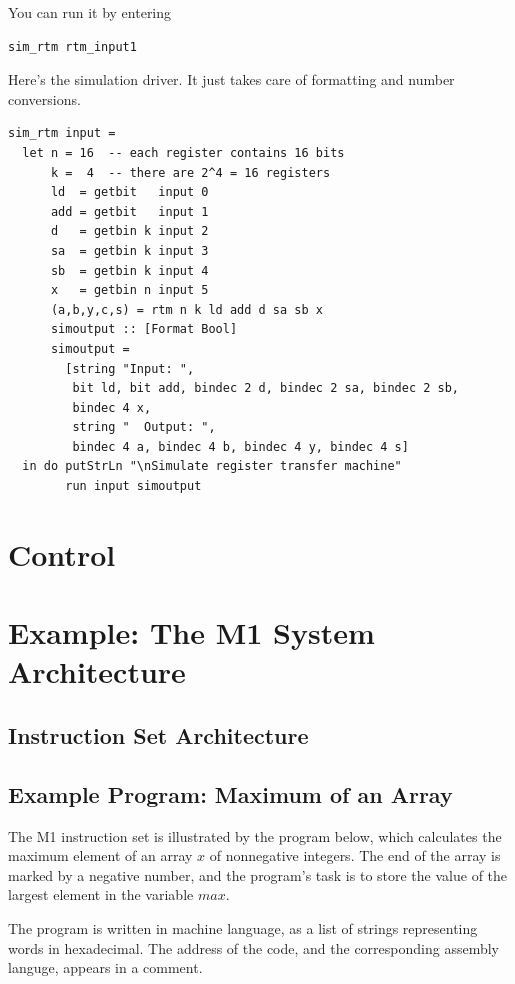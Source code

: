 \documentclass[a4paper,openany,fleqn]{book}
\begin{document}
You can run it by entering

\begin{verbatim}
sim_rtm rtm_input1
\end{verbatim}

Here's the simulation driver.  It just takes care of formatting and
number conversions.

\begin{verbatim}
sim_rtm input =
  let n = 16  -- each register contains 16 bits
      k =  4  -- there are 2^4 = 16 registers
      ld  = getbit   input 0
      add = getbit   input 1
      d   = getbin k input 2
      sa  = getbin k input 3
      sb  = getbin k input 4
      x   = getbin n input 5
      (a,b,y,c,s) = rtm n k ld add d sa sb x
      simoutput :: [Format Bool]
      simoutput =
        [string "Input: ",
         bit ld, bit add, bindec 2 d, bindec 2 sa, bindec 2 sb,
         bindec 4 x,
         string "  Output: ",
         bindec 4 a, bindec 4 b, bindec 4 y, bindec 4 s]
  in do putStrLn "\nSimulate register transfer machine"
        run input simoutput
\end{verbatim}


\chapter{Control}
\label{sec:control}

\chapter{Example: The M1 System Architecture}
\label{sec:M1-system-architecture}

\section{Instruction Set Architecture}
\label{sec:instr-set-arch}

\section{Example Program: Maximum of an Array}
\label{sec:m1-max-program}

The M1 instruction set is illustrated by the program below, which
calculates the maximum element of an array $x$ of nonnegative
integers.  The end of the array is marked by a negative number, and
the program's task is to store the value of the largest element in the
variable $\mathit{max}$.

The program is written in machine language, as a list of strings
representing words in hexadecimal.  The address of the code, and the
corresponding assembly languge, appears in a comment.
\end{document}
